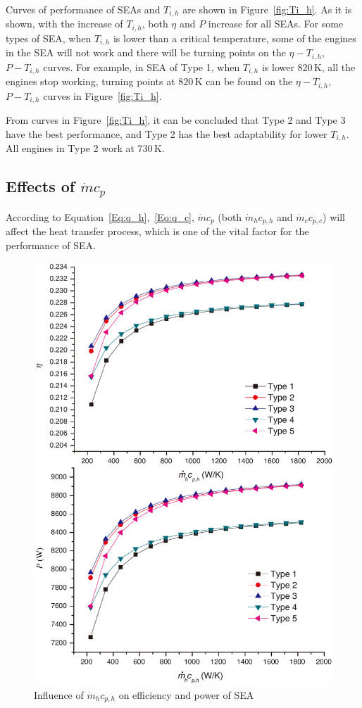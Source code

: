 Curves of performance of SEAs and $T_{i,h}$ are shown in Figure~\ref{fig:Ti_h}.
As it is shown, with the increase of $T_{i,h}$, both $\eta$ and $P$ increase for all SEAs. For some types of SEA, when $T_{i,h}$ is lower than a critical temperature, some of the engines in the SEA will not work and there will be turning points on the $\eta-T_{i,h}$, $P-T_{i,h}$ curves. For example, in SEA of Type 1, when $T_{i,h}$ is lower 820\,K, all the engines stop working, turning points at 820\,K can be found on the $\eta-T_{i,h}$, $P-T_{i,h}$ curves in Figure~\ref{fig:Ti_h}. 

From curves in Figure~\ref{fig:Ti_h}, it can be concluded that Type 2 and Type 3 have the best performance, and Type 2 has the best adaptability for lower $T_{i,h}$. All engines in Type 2 work at 730\,K.

\subsection{Effects of $\dot{m}c_p$}

According to Equation~\ref{Eq:q_h},~\ref{Eq:q_c}, $\dot{m}c_p$ (both $\dot{m}_hc_{p,h}$ and $\dot{m}_cc_{p,c}$) will affect the heat transfer process, which is one of the vital factor for the performance of SEA.


\noindent \begin{figure}[htbp]
\begin{center}
	\includegraphics[width = 0.7\columnwidth]{fig/qm_hcp_h}
	\caption{Influence of $\dot{m}_hc_{p,h}$ on efficiency and power of SEA}
	\label{fig:qm_hcp_h}
\end{center}
\end{figure}

